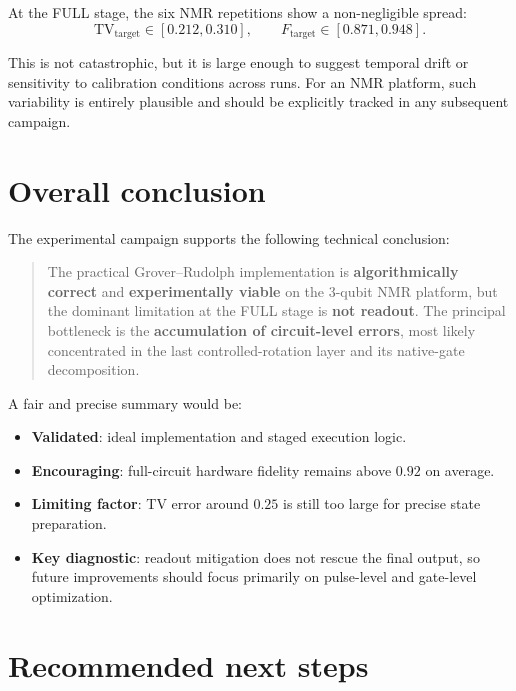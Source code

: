 \documentclass[11pt]{article}
\begin{document}
At the FULL stage, the six NMR repetitions show a non-negligible spread:
\[
\mathrm{TV}_{\mathrm{target}} \in [0.212, 0.310],
\qquad
F_{\mathrm{target}} \in [0.871, 0.948].
\]

This is not catastrophic, but it is large enough to suggest temporal drift or sensitivity to calibration conditions across runs. For an NMR platform, such variability is entirely plausible and should be explicitly tracked in any subsequent campaign.

\section{Overall conclusion}

The experimental campaign supports the following technical conclusion:

\begin{quote}
The practical Grover--Rudolph implementation is \textbf{algorithmically correct} and \textbf{experimentally viable} on the 3-qubit NMR platform, but the dominant limitation at the FULL stage is \textbf{not readout}. The principal bottleneck is the \textbf{accumulation of circuit-level errors}, most likely concentrated in the last controlled-rotation layer and its native-gate decomposition.
\end{quote}

A fair and precise summary would be:
\begin{itemize}
\item \textbf{Validated}: ideal implementation and staged execution logic.
\item \textbf{Encouraging}: full-circuit hardware fidelity remains above $0.92$ on average.
\item \textbf{Limiting factor}: TV error around $0.25$ is still too large for precise state preparation.
\item \textbf{Key diagnostic}: readout mitigation does not rescue the final output, so future improvements should focus primarily on pulse-level and gate-level optimization.
\end{itemize}

\section{Recommended next steps}
\end{document}
